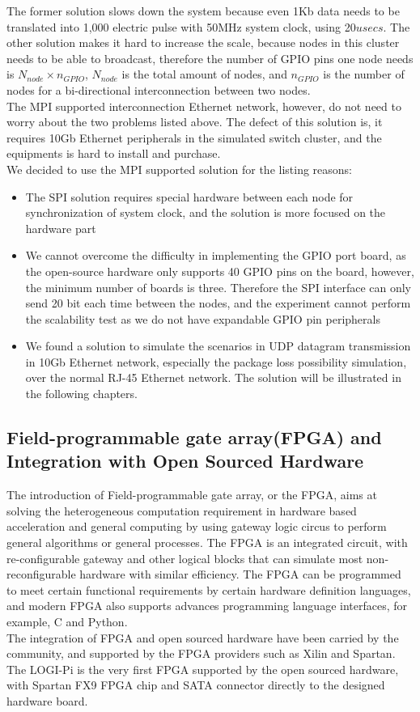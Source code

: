 \documentclass[11pt,openright,a4paper]{report}
\begin{document}
The former solution slows down the system because even 1Kb data needs to be translated into 1,000 electric pulse with 50MHz system clock, using 20$usecs$. The other solution makes it hard to increase the scale, because nodes in this cluster needs to be able to broadcast, therefore the number of GPIO pins one node needs is $N_{node}\times n_{GPIO}$, $N_{node}$ is the total amount of nodes, and $n_{GPIO}$ is the number of nodes for a bi-directional interconnection between two nodes.\\ 
The MPI supported interconnection Ethernet network, however, do not need to worry about the two problems listed above. The defect of this solution is, it requires 10Gb Ethernet peripherals in the simulated switch cluster, and the equipments is hard to install and purchase.\\
We decided to use the MPI supported solution for the listing reasons:
\begin{itemize}
	\item The SPI solution requires special hardware between each node for synchronization of system clock, and the solution is more focused on the hardware part
	\item We cannot overcome the difficulty in implementing the GPIO port board, as the open-source hardware only supports 40 GPIO pins on the board, however, the minimum number of boards is three. Therefore the SPI interface can only send 20 bit each time between the nodes, and the experiment cannot perform the scalability test as we do not have expandable GPIO pin peripherals
	\item We found a solution to simulate the scenarios in UDP datagram transmission in 10Gb Ethernet network, especially the package loss possibility simulation, over the normal RJ-45 Ethernet network. The solution will be illustrated in the following chapters.
\end{itemize}
\subsection{Field-programmable gate array(FPGA) and Integration with Open Sourced Hardware}
The introduction of Field-programmable gate array, or the FPGA, aims at solving the heterogeneous computation requirement in hardware based acceleration and general computing by using gateway logic circus to perform general algorithms or general processes\cite{hauck2010reconfigurable}. The FPGA is an integrated circuit, with re-configurable gateway and other logical blocks that can simulate most non-reconfigurable hardware with similar efficiency. The FPGA can be programmed to meet certain functional requirements by certain hardware definition languages, and modern FPGA also supports advances programming language interfaces, for example, C and Python.\\
The integration of FPGA and open sourced hardware have been carried by the community, and supported by the FPGA providers such as Xilin and Spartan. The LOGI-Pi is the very first FPGA supported by the open sourced hardware, with Spartan FX9 FPGA chip and SATA connector directly to the designed hardware board\cite{logipi}.
\end{document}
